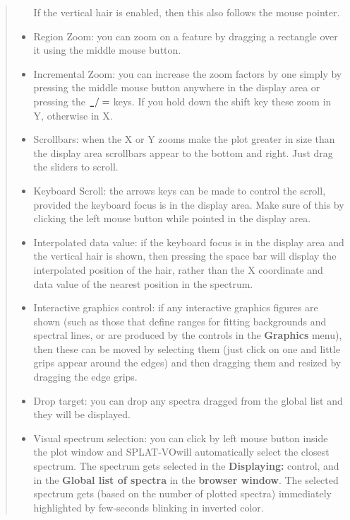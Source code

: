 \documentclass[twoside,11pt]{article}
\renewcommand{\_}{\texttt{\symbol{95}}}
\newcommand{\SPLAT}{\textsf{SPLAT-VO}}
\newcommand{\menuitem}[1]{\textbf{#1}}
\newcommand{\labelitem}[1]{\textbf{#1}}
\begin{document}
\begin{quote}
\begin{itemize}
  If the vertical hair is enabled, then this also follows the mouse
  pointer.

  \item Region Zoom: you can zoom on a feature by dragging a rectangle
  over it using the middle mouse button.

  \item Incremental Zoom: you can increase the zoom factors by one
  simply by pressing the middle mouse button anywhere in the display
  area or pressing the $\_/=$ keys. If you hold down the shift key
  these zoom in Y, otherwise in X.

  \item Scrollbars: when the X or Y zooms make the plot greater in size
  than the display area scrollbars appear to the bottom and right. Just
  drag the sliders to scroll.

  \item Keyboard Scroll: the arrows keys can be made to control the
  scroll, provided the keyboard focus is in the display area. Make sure
  of this by clicking the left mouse button while pointed in the display
  area.

  \item Interpolated data value: if the keyboard focus is in the
  display area and the vertical hair is shown, then pressing the space
  bar will display the interpolated position of the hair, rather than
  the X coordinate and data value of the nearest position in the
  spectrum.

  \item Interactive graphics control: if any interactive graphics figures are
  shown (such as those that define ranges for fitting backgrounds and spectral
  lines, or are produced by the controls in the \menuitem{Graphics} menu),
  then these can be moved by selecting them (just click on one and little
  grips appear around the edges) and then dragging them and resized by
  dragging the edge grips.

  \item Drop target: you can drop any spectra dragged from the global
  list and they will be displayed.
  
  \item Visual spectrum selection: you can click by left mouse button 
  inside the plot window and \SPLAT will automatically select the closest 
  spectrum. The spectrum gets selected in the \labelitem{Displaying:} 
  control, and in the \labelitem{Global list of spectra} in the 
  \labelitem{browser window}. The selected spectrum gets (based on the 
  number of plotted spectra) immediately highlighted by few-seconds 
  blinking in inverted color.

 \end{itemize}
\end{quote}
\end{document}
